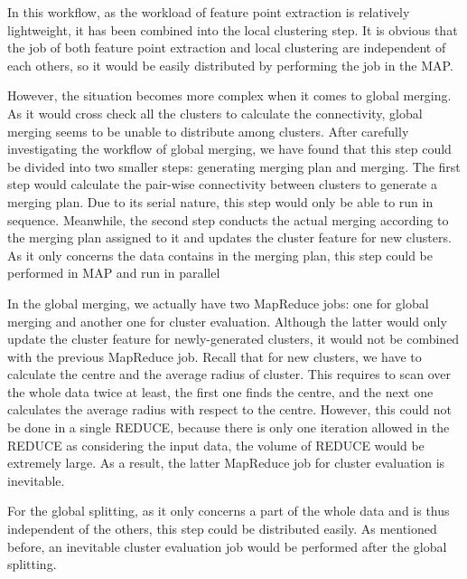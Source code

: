 \documentclass[conference]{IEEEtran}
\begin{document}
In this workflow, as the workload of feature point extraction is relatively lightweight, it has been combined into the local clustering step. It is obvious that the job of both feature point extraction and local clustering are independent of each others, so it would be easily distributed by performing the job in the MAP.


However, the situation becomes more complex when it comes to global merging. As it would cross check all the clusters to calculate the connectivity, global merging seems to be unable to distribute among clusters. After carefully investigating the workflow of global merging, we have found that this step could be divided into two smaller steps: generating merging plan and merging. The first step would calculate the pair-wise connectivity between clusters to generate a merging plan. Due to its serial nature, this step would only be able to run in sequence. Meanwhile, the second step conducts the actual merging according to the merging plan assigned to it and updates the cluster feature for new clusters. As it only concerns the data contains in the merging plan, this step could be performed in MAP and run in parallel 


In the global merging, we actually have two MapReduce jobs: one for global merging and another one for cluster evaluation. Although the latter would only update the cluster feature for newly-generated clusters, it would not be combined with the previous MapReduce job. Recall that for new clusters, we have to calculate the centre and the average radius of cluster. This requires to scan over the whole data twice at least, the first one finds the centre, and the next one calculates the average radius with respect to the centre. However, this could not be done in a single REDUCE, because there is only one iteration allowed in the REDUCE as considering the input data, the volume of REDUCE would be extremely large. As a result, the latter MapReduce job for cluster evaluation is inevitable.

For the global splitting, as it only concerns a part of the whole data and is thus independent of the others, this step could be distributed easily. As mentioned before, an inevitable cluster evaluation job would be performed after the global splitting.
\end{document}
